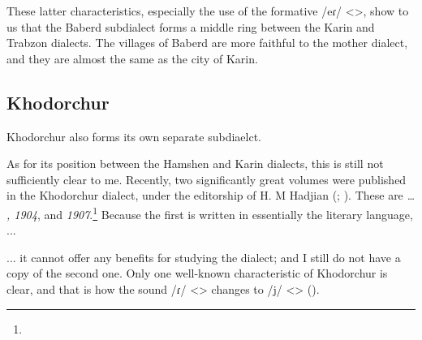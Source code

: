 These latter characteristics, especially the use of the formative /eɾ/ <>, show to us that the Baberd subdialect forms a middle ring between the Karin and Trabzon dialects. The villages of Baberd are more faithful to the mother dialect, and they are almost the same as the city of Karin. 
\subsection{Khodorchur}
Khodorchur also forms its own separate subdiaelct. 


As for its position between the Hamshen and Karin dialects, this is still not sufficiently clear to me. Recently, two significantly great volumes were published in the Khodorchur dialect, under the editorship of H. M Hadjian (; ). These are \textit{… , 1904}, and \textit{ 1907}.\footnote{} Because the first is written in essentially the literary language, ... 


\begin{adjarianpage}\label{page:113}\end{adjarianpage}%

... it cannot offer any benefits for studying the dialect; and I still do not have a copy of the second one. Only one well-known characteristic of Khodorchur is clear, and that is how the sound /ɾ/ <> changes to /j/ <> (). 


